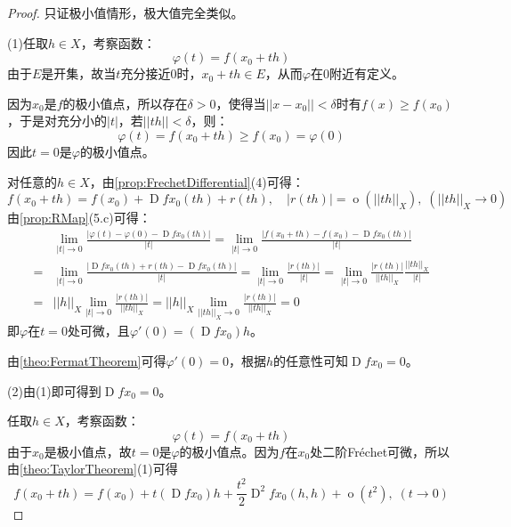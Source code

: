 \begin{proof}
	只证极小值情形，极大值完全类似。\par
	(1)任取$h\in X$，考察函数：
	\begin{equation*}
		\varphi(t)=f(x_0+th)
	\end{equation*}
	由于$E$是开集，故当$t$充分接近$0$时，$x_0+th\in E$，从而$\varphi$在$0$附近有定义。\par
	因为$x_0$是$f$的极小值点，所以存在$\delta>0$，使得当$||x-x_0||<\delta$时有$f(x)\geqslant f(x_0)$，于是对充分小的$|t|$，若$||th||<\delta$，则：
	\begin{equation*}
		\varphi(t)=f(x_0+th)\geqslant f(x_0)=\varphi(0)
	\end{equation*}
	因此$t=0$是$\varphi$的极小值点。\par
	对任意的$h\in X$，由\cref{prop:FrechetDifferential}(4)可得：
	\begin{equation*}
		f(x_0+th)=f(x_0)+\operatorname{D}fx_0(th)+r(th),\quad|r(th)|=\operatorname{o}(||th||_X),\;(||th||_X\to0)
	\end{equation*}
	由\cref{prop:RMap}(5.c)可得：
	\begin{align*}
		&\lim_{|t|\to0}\frac{|\varphi(t)-\varphi(0)-\operatorname{D}fx_0(th)|}{|t|}=\lim_{|t|\to0}\frac{|f(x_0+th)-f(x_0)-\operatorname{D}fx_0(th)|}{|t|} \\
		=&\lim_{|t|\to0}\frac{|\operatorname{D}fx_0(th)+r(th)-\operatorname{D}fx_0(th)|}{|t|}=\lim_{|t|\to0}\frac{|r(th)|}{|t|}=\lim_{|t|\to0}\frac{|r(th)|}{||th||_X}\frac{||th||_X}{|t|} \\
		=&||h||_X\lim_{|t|\to0}\frac{|r(th)|}{||th||_X}=||h||_X\lim_{||th||_X\to0}\frac{|r(th)|}{||th||_X}=0
	\end{align*}
	即$\varphi$在$t=0$处可微，且$\varphi'(0)=(\operatorname{D}fx_0)h$。\par
	由\cref{theo:FermatTheorem}可得$\varphi'(0)=0$，根据$h$的任意性可知$\operatorname{D}fx_0=0$。\par
	(2)由(1)即可得到$\operatorname{D}fx_0=0$。\par
	任取$h\in X$，考察函数：
	\begin{equation*}
		\varphi(t)=f(x_0+th)
	\end{equation*}
	由于$x_0$是极小值点，故$t=0$是$\varphi$的极小值点。因为$f$在$x_0$处二阶Fr\'echet可微，所以由\cref{theo:TaylorTheorem}(1)可得
	\begin{equation*}
		f(x_0+th)=f(x_0)+t(\operatorname{D}fx_0)h+\frac{t^2}{2}\operatorname{D}^2fx_0(h,h)+\operatorname{o}(t^2),\;(t\to0)
	\end{equation*}

\end{proof}
